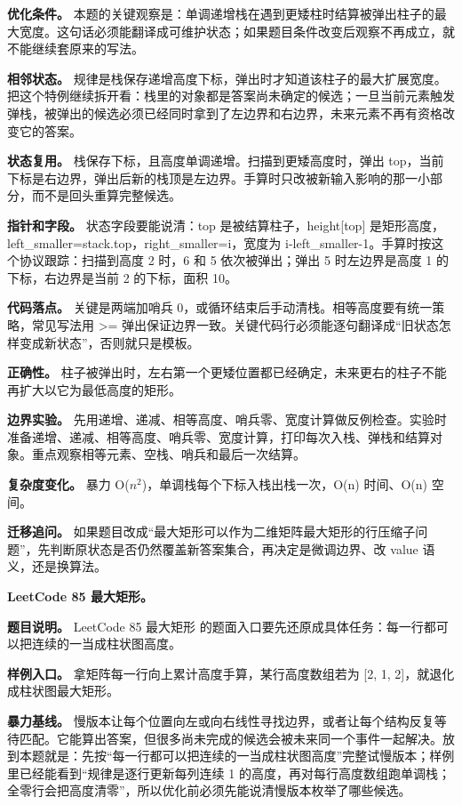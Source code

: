 \textbf{优化条件。} 本题的关键观察是：单调递增栈在遇到更矮柱时结算被弹出柱子的最大宽度。这句话必须能翻译成可维护状态；如果题目条件改变后观察不再成立，就不能继续套原来的写法。

\textbf{相邻状态。} 规律是栈保存递增高度下标，弹出时才知道该柱子的最大扩展宽度。把这个特例继续拆开看：栈里的对象都是答案尚未确定的候选；一旦当前元素触发弹栈，被弹出的候选必须已经同时拿到了左边界和右边界，未来元素不再有资格改变它的答案。

\textbf{状态复用。} 栈保存下标，且高度单调递增。扫描到更矮高度时，弹出 top，当前下标是右边界，弹出后新的栈顶是左边界。手算时只改被新输入影响的那一小部分，而不是回头重算完整候选。

\textbf{指针和字段。} 状态字段要能说清：top 是被结算柱子，height[top] 是矩形高度，left\_smaller=stack.top，right\_smaller=i，宽度为 i-left\_smaller-1。手算时按这个协议跟踪：扫描到高度 2 时，6 和 5 依次被弹出；弹出 5 时左边界是高度 1 的下标，右边界是当前 2 的下标，面积 10。

\textbf{代码落点。} 关键是两端加哨兵 0，或循环结束后手动清栈。相等高度要有统一策略，常见写法用 >= 弹出保证边界一致。关键代码行必须能逐句翻译成“旧状态怎样变成新状态”，否则就只是模板。

\textbf{正确性。} 柱子被弹出时，左右第一个更矮位置都已经确定，未来更右的柱子不能再扩大以它为最低高度的矩形。

\textbf{边界实验。} 先用递增、递减、相等高度、哨兵零、宽度计算做反例检查。实验时准备递增、递减、相等高度、哨兵零、宽度计算，打印每次入栈、弹栈和结算对象。重点观察相等元素、空栈、哨兵和最后一次结算。

\textbf{复杂度变化。} 暴力 O(\ensuremath{n^{2}})，单调栈每个下标入栈出栈一次，O(n) 时间、O(n) 空间。

\textbf{迁移追问。} 如果题目改成“最大矩形可以作为二维矩阵最大矩形的行压缩子问题”，先判断原状态是否仍然覆盖新答案集合，再决定是微调边界、改 value 语义，还是换算法。

\noindent\textbf{LeetCode 85 最大矩形。}

\textbf{题目说明。} LeetCode 85 最大矩形 的题面入口要先还原成具体任务：每一行都可以把连续的一当成柱状图高度。

\textbf{样例入口。} 拿矩阵每一行向上累计高度手算，某行高度数组若为 [2, 1, 2]，就退化成柱状图最大矩形。

\textbf{暴力基线。} 慢版本让每个位置向左或向右线性寻找边界，或者让每个结构反复等待匹配。它能算出答案，但很多尚未完成的候选会被未来同一个事件一起解决。放到本题就是：先按“每一行都可以把连续的一当成柱状图高度”完整试慢版本；样例里已经能看到“规律是逐行更新每列连续 1 的高度，再对每行高度数组跑单调栈；全零行会把高度清零”，所以优化前必须先能说清慢版本枚举了哪些候选。

